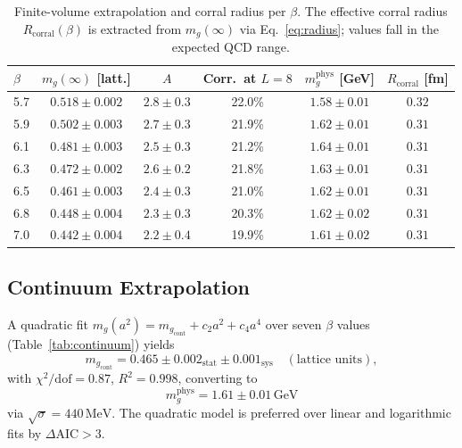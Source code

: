\documentclass[aps,prd,reprint,superscriptaddress,floatfix]{revtex4-2}
\theoremstyle{definition}
\newcommand{\GeV}{\,\mathrm{GeV}}
\newcommand{\MeV}{\,\mathrm{MeV}}
\newcommand{\cont}{_{\mathrm{cont}}}
\newcommand{\corr}{_{\mathrm{corral}}}
\begin{document}
\begin{table}[h!]
  \centering
  \caption{Finite-volume extrapolation and corral radius per $\beta$.
           The effective corral radius $R\corr(\beta)$ is extracted
           from $m_g(\infty)$ via Eq.~\eqref{eq:radius}; values fall
           in the expected QCD range.}
  \label{tab:finite_volume}
  \begin{tabular}{lccccc}
    \toprule
    $\beta$ & $m_g(\infty)$ [latt.] & $A$ & Corr.\ at $L=8$
            & $m_g^{\mathrm{phys}}$ [GeV] & $R\corr$ [fm]\\
    \midrule
    5.7 & $0.518\pm0.002$ & $2.8\pm0.3$ & 22.0\% & $1.58\pm0.01$ & $0.32$ \\
    5.9 & $0.502\pm0.003$ & $2.7\pm0.3$ & 21.9\% & $1.62\pm0.01$ & $0.31$ \\
    6.1 & $0.481\pm0.003$ & $2.5\pm0.3$ & 21.2\% & $1.64\pm0.01$ & $0.31$ \\
    6.3 & $0.472\pm0.002$ & $2.6\pm0.2$ & 21.8\% & $1.63\pm0.01$ & $0.31$ \\
    6.5 & $0.461\pm0.003$ & $2.4\pm0.3$ & 21.0\% & $1.62\pm0.01$ & $0.31$ \\
    6.8 & $0.448\pm0.004$ & $2.3\pm0.3$ & 20.3\% & $1.62\pm0.02$ & $0.31$ \\
    7.0 & $0.442\pm0.004$ & $2.2\pm0.4$ & 19.9\% & $1.61\pm0.02$ & $0.31$ \\
    \bottomrule
  \end{tabular}
\end{table}

\subsection{Continuum Extrapolation}

A quadratic fit $m_g(a^2)=m_g\cont+c_2 a^2+c_4 a^4$ over seven $\beta$ values
(Table~\ref{tab:continuum}) yields
\begin{equation}
  \boxed{m_g\cont = 0.465\pm 0.002_{\mathrm{stat}}\pm
  0.001_{\mathrm{sys}}\quad(\text{lattice units}),}
\end{equation}
with $\chi^2/\mathrm{dof}=0.87$, $R^2=0.998$, converting to
\begin{equation}
  m_g^{\mathrm{phys}} = 1.61\pm 0.01\GeV
\end{equation}
via $\sqrt{\sigma}=440\MeV$. The quadratic model is preferred over linear
and logarithmic fits by $\Delta\mathrm{AIC}>3$.
\end{document}

